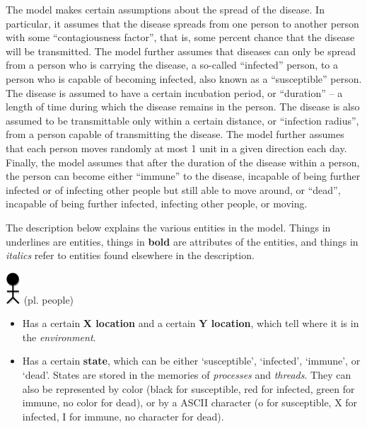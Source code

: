 \documentclass[letterpaper,10pt,openany,oneside]{sphinxmanual}
\begin{document}
The model makes certain assumptions about the spread of the disease. In
particular, it assumes that the disease spreads from one person to
another person with some “contagiousness factor”, that is, some percent
chance that the disease will be transmitted. The model further assumes
that diseases can only be spread from a person who is carrying the
disease, a so-called “infected” person, to a person who is capable of
becoming infected, also known as a “susceptible” person. The disease is
assumed to have a certain incubation period, or “duration” – a length of
time during which the disease remains in the person. The disease is also
assumed to be transmittable only within a certain distance, or
“infection radius”, from a person capable of transmitting the disease.
The model further assumes that each person moves randomly at most 1 unit
in a given direction each day. Finally, the model assumes that after the
duration of the disease within a person, the person can become either
“immune” to the disease, incapable of being further infected or of
infecting other people but still able to move around, or “dead”,
incapable of being further infected, infecting other people, or moving.

The description below explains the various entities in the model. Things
in underlines are entities, things in \textbf{bold} are attributes of the
entities, and things in \emph{italics} refer to entities found elsewhere in
the description.

\includegraphics{img-0.png} (pl. people)
\begin{itemize}
\item {} 
Has a certain \textbf{X location} and a certain \textbf{Y location}, which tell where it is in the \emph{environment}.

\item {} 
Has a certain \textbf{state}, which can be either ‘susceptible’, ‘infected’, ‘immune’, or ‘dead’. States are stored in the memories of \emph{processes} and \emph{threads}. They can also be represented by color (black for susceptible, red for infected, green for immune, no color for dead), or by a ASCII character (o for susceptible, X for infected, I for immune, no character for dead).

\end{itemize}
\end{document}
